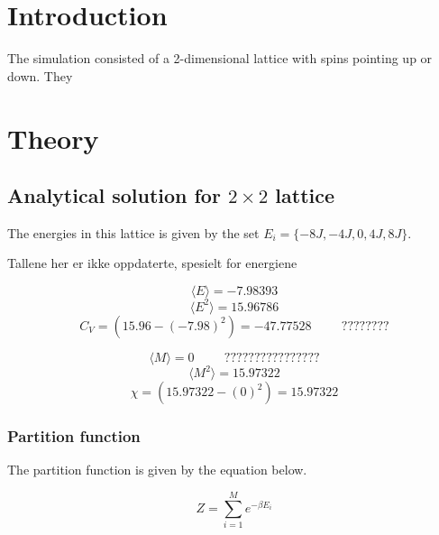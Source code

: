 \documentclass{article}
\begin{document}
\vspace{1cm}

\tableofcontents

\vspace{1cm}

\vspace{1cm}

\section{Introduction} \label{sec:Introduction}

The simulation consisted of a 2-dimensional lattice with spins pointing up or down. They

\vspace{1cm}

\section{Theory} \label{sec:Theory}

\subsection{Analytical solution for \texorpdfstring{ $2 \times 2$ }{text} lattice}

The energies in this lattice is given by the set $E_i = \{- 8 J, -4J, 0 , 4J, 8J \}$.

Tallene her er ikke oppdaterte, spesielt for energiene

$$ \langle E \rangle = - 7.98393 $$
$$ \langle E^2 \rangle = 15.96786 $$
$$ C_V = (15.96 - (-7.98)^2) = -47.77528 \hspace{1cm} ???????? $$

$$ \langle M \rangle = 0 \hspace{1cm} ???????????????? $$
$$ \langle M^2 \rangle = 15.97322$$
$$ \chi = (15.97322 - (0)^2) = 15.97322 $$


\subsubsection{Partition function}

The partition function is given by the equation below.

\begin{equation} \label{eq:partitionfunction}
    Z = \sum_{i=1} ^{M} e^{- \beta E_i}
\end{equation} \\
\end{document}
